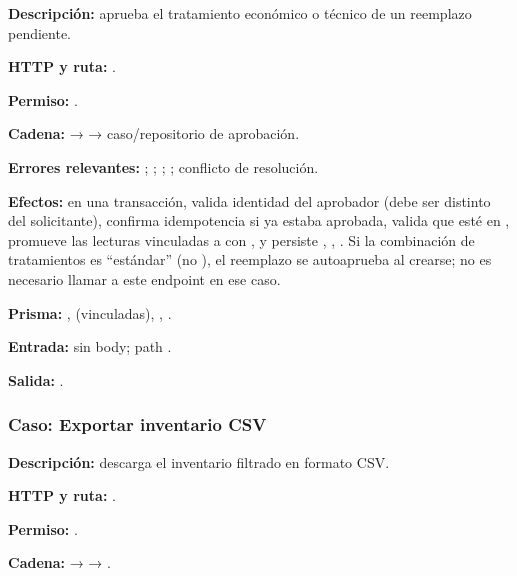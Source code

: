 \textbf{Descripción:} aprueba el tratamiento económico o técnico de un reemplazo pendiente.  

\textbf{HTTP y ruta:} \texttt{}.  

\textbf{Permiso:} \texttt{}.  

\textbf{Cadena:} \texttt{} → \texttt{} → caso/repositorio de aprobación.  

\textbf{Errores relevantes:} \texttt{}; \texttt{}; \texttt{}; \texttt{}; conflicto de resolución.  

\textbf{Efectos:} en una transacción, valida identidad del aprobador (debe ser distinto del solicitante), confirma idempotencia si ya estaba aprobada, valida que esté en \texttt{}, promueve las lecturas vinculadas a \texttt{} con \texttt{}, y persiste \texttt{}, \texttt{}, \texttt{}. Si la combinación de tratamientos es ``est\'andar'' (no \texttt{}), el reemplazo se autoaprueba al crearse; no es necesario llamar a este endpoint en ese caso.

\textbf{Prisma:} \texttt{}, \texttt{} (vinculadas), \texttt{}, \texttt{}.  

\textbf{Entrada:} sin body; path \texttt{}.  

\textbf{Salida:} \texttt{}.


\subsubsection{Caso: Exportar inventario CSV}


\textbf{Descripción:} descarga el inventario filtrado en formato CSV.  

\textbf{HTTP y ruta:} \texttt{}.  

\textbf{Permiso:} \texttt{}.  

\textbf{Cadena:} \texttt{} → \texttt{} → \texttt{}.  

